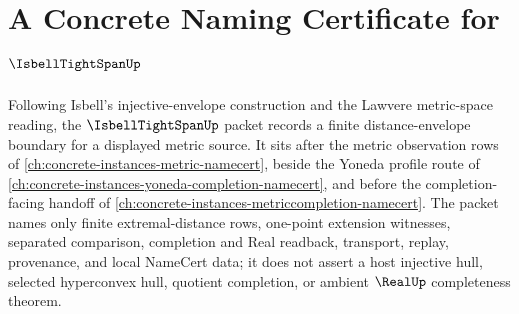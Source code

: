 \chapter{A Concrete Naming Certificate for $\IsbellTightSpanUp$}
\label{ch:concrete-instances-isbell-tight-span-namecert}

Following Isbell's injective-envelope construction and the Lawvere metric-space reading, the $\IsbellTightSpanUp$ packet records a finite distance-envelope boundary for a displayed metric source. It sits after the metric observation rows of \autoref{ch:concrete-instances-metric-namecert}, beside the Yoneda profile route of \autoref{ch:concrete-instances-yoneda-completion-namecert}, and before the completion-facing handoff of \autoref{ch:concrete-instances-metriccompletion-namecert}. The packet names only finite extremal-distance rows, one-point extension witnesses, separated comparison, completion and Real readback, transport, replay, provenance, and local NameCert data; it does not assert a host injective hull, selected hyperconvex hull, quotient completion, or ambient $\RealUp$ completeness theorem.

